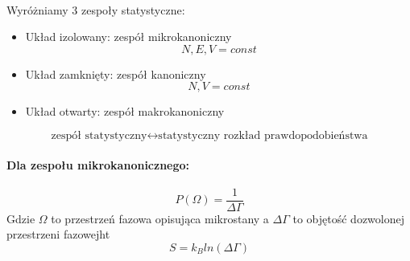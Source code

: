 \documentclass{article}
\begin{document}
		\paragraph{}Wyróżniamy 3 zespoły statystyczne:
		\begin{itemize}
			\item Układ izolowany: zespół mikrokanoniczny 
			\begin{equation}
			N,E,V=const
			\end{equation}
			\item Układ zamknięty: zespół kanoniczny
			\begin{equation}
			N,V = const
			\end{equation}
			\item Układ otwarty: zespół makrokanoniczny
		\end{itemize}
		\begin{equation}
		\text{zespół statystyczny} \longleftrightarrow \text{statystyczny rozkład prawdopodobieństwa}
		\end{equation}
		\paragraph{Dla zespołu mikrokanonicznego:}
		\begin{equation}
		P(\Omega) = \frac{1}{\Delta \Gamma}
		\end{equation}
		Gdzie $ \Omega $ to przestrzeń fazowa opisująca mikrostany a $ \Delta \Gamma $ to objętość dozwolonej przestrzeni fazowejht
		\begin{equation}
		S = k_Bln(\Delta \Gamma)
		\end{equation}
\end{document}
